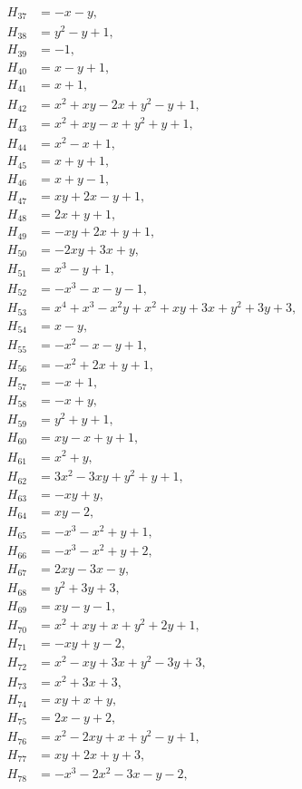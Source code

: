 \documentclass[11pt]{article}
\begin{document}
\begin{align*}
H_{37}&=-x-y,\\
H_{38}&=y^{2}-y+1,\\
H_{39}&=-1,\\
H_{40}&=x-y+1,\\
H_{41}&=x+1,\\
H_{42}&=x^{2}+xy-2x+y^{2}-y+1,\\
H_{43}&=x^{2}+xy-x+y^{2}+y+1,\\
H_{44}&=x^{2}-x+1,\\
H_{45}&=x+y+1,\\
H_{46}&=x+y-1,\\
H_{47}&=xy+2x-y+1,\\
H_{48}&=2x+y+1,\\
H_{49}&=-xy+2x+y+1,\\
H_{50}&=-2xy+3x+y,\\
H_{51}&=x^{3}-y+1,\\
H_{52}&=-x^{3}-x-y-1,\\
H_{53}&=x^{4}+x^{3}-x^{2}y+x^{2}+xy+3x+y^{2}+3y+3,\\
H_{54}&=x-y,\\
H_{55}&=-x^{2}-x-y+1,\\
H_{56}&=-x^{2}+2x+y+1,\\
H_{57}&=-x+1,\\
H_{58}&=-x+y,\\
H_{59}&=y^{2}+y+1,\\
H_{60}&=xy-x+y+1,\\
H_{61}&=x^{2}+y,\\
H_{62}&=3x^{2}-3xy+y^{2}+y+1,\\
H_{63}&=-xy+y,\\
H_{64}&=xy-2,\\
H_{65}&=-x^{3}-x^{2}+y+1,\\
H_{66}&=-x^{3}-x^{2}+y+2,\\
H_{67}&=2xy-3x-y,\\
H_{68}&=y^{2}+3y+3,\\
H_{69}&=xy-y-1,\\
H_{70}&=x^{2}+xy+x+y^{2}+2y+1,\\
H_{71}&=-xy+y-2,\\
H_{72}&=x^{2}-xy+3x+y^{2}-3y+3,\\
H_{73}&=x^{2}+3x+3,\\
H_{74}&=xy+x+y,\\
H_{75}&=2x-y+2,\\
H_{76}&=x^{2}-2xy+x+y^{2}-y+1,\\
H_{77}&=xy+2x+y+3,\\
H_{78}&=-x^{3}-2x^{2}-3x-y-2,\\

\end{align*}
\end{document}
